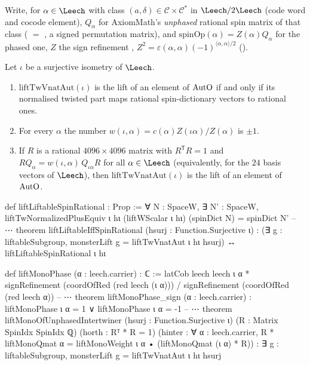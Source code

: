 Write, for $\alpha\in\Leech$ with class $(a,\delta)\in\mathcal C\times\mathcal C^*$ in $\Leech/2\Leech$ (code word and cocode
element), $Q_\alpha$ for AxiomMath's \emph{unphased} rational spin matrix of that class ( $=$
, a signed permutation matrix), and $\mathrm{spinOp}(\alpha)=Z(\alpha)Q_\alpha$ for the phased one,
$Z$ the sign refinement , $Z^2=\varepsilon(\alpha,\alpha)(-1)^{\langle\alpha,\alpha\rangle/2}$
().

\begin{theorem}\label{ch22:thm:criterion}
Let $\iota$ be a surjective isometry of $\Leech$.
\begin{enumerate}[label=(\alph*)]
\item $\mathrm{liftTwVnatAut}(\iota)$ is the lift of an element of $\mathrm{AutO}$ if and only if its normalised
  twisted part maps rational spin-dictionary vectors to rational ones.
\item For every $\alpha$ the number $w(\iota,\alpha)=c(\alpha)Z(\iota\alpha)/Z(\alpha)$ is $\pm1$.
\item If $R$ is a rational $4096\times4096$ matrix with $R^{\mathsf T}R=1$ and $RQ_\alpha=w(\iota,\alpha)\,Q_{\iota\alpha}R$
  for all $\alpha\in\Leech$ (equivalently, for the $24$ basis vectors of $\Leech$), then $\mathrm{liftTwVnatAut}(\iota)$ is
  the lift of an element of $\mathrm{AutO}$.
\end{enumerate}
\end{theorem}
\begin{leancode}
def liftLiftableSpinRational : Prop :=
  ∀ N : SpaceW, ∃ N' : SpaceW,
    liftTwNormalizedPlusEquiv ι hι (liftWScalar ι hι) (spinDict N) = spinDict N'
-- ⋯
theorem liftLiftableIffSpinRational (hsurj : Function.Surjective ι) :
    (∃ g : liftableSubgroup, monsterLift g = liftTwVnatAut ι hι hsurj) ↔
      liftLiftableSpinRational ι hι
\end{leancode}
\begin{leancode}
def liftMonoPhase (α : leech.carrier) : ℂ :=
  latCob leech leech ι α * signRefinement (coordOfRed (red leech (ι α))) /
    signRefinement (coordOfRed (red leech α))
-- ⋯
theorem liftMonoPhase_sign (α : leech.carrier) :
    liftMonoPhase ι α = 1 ∨ liftMonoPhase ι α = -1
-- ⋯
theorem liftMonoOfUnphasedIntertwiner (hsurj : Function.Surjective ι)
    (R : Matrix SpinIdx SpinIdx ℚ) (horth : Rᵀ * R = 1)
    (hinter : ∀ α : leech.carrier,
      R * liftMonoQmat α = liftMonoWeight ι α • (liftMonoQmat (ι α) * R)) :
    ∃ g : liftableSubgroup, monsterLift g = liftTwVnatAut ι hι hsurj
\end{leancode}
